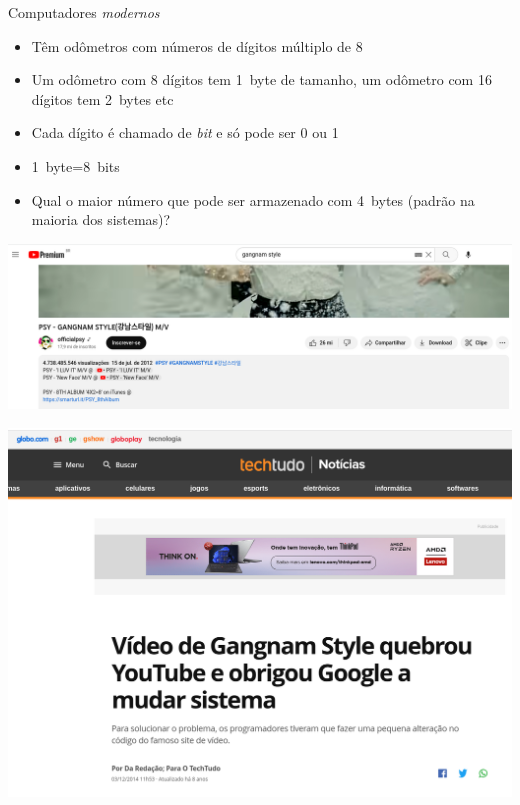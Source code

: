 \begin{frame}{Computadores \textit{modernos}}
    \begin{itemize}
        \item Têm odômetros com números de dígitos múltiplo de 8
        \item Um odômetro com 8 dígitos tem \SI{1}{byte} de tamanho, um odômetro 
            com 16 dígitos tem \SI{2}{bytes} etc
        \item Cada dígito é chamado de \textit{bit} e só pode ser 0 ou 1
        \item  \SI{1}{byte}=\SI{8}{bits}
        \item Qual o maior número que pode ser
            armazenado com \SI{4}{bytes} (padrão na maioria dos sistemas)? 
    \end{itemize}

    \centering
    \includegraphics[height=0.55\textheight-16.32pt]{images/Captura de tela de 2023-03-26 23-58-54.png}
\end{frame}

\begin{frame}
    \begin{center}
        \includegraphics[height=0.9\textheight]{images/Captura de tela de 2023-03-27 00-22-46.png}
    \end{center}
\end{frame}

